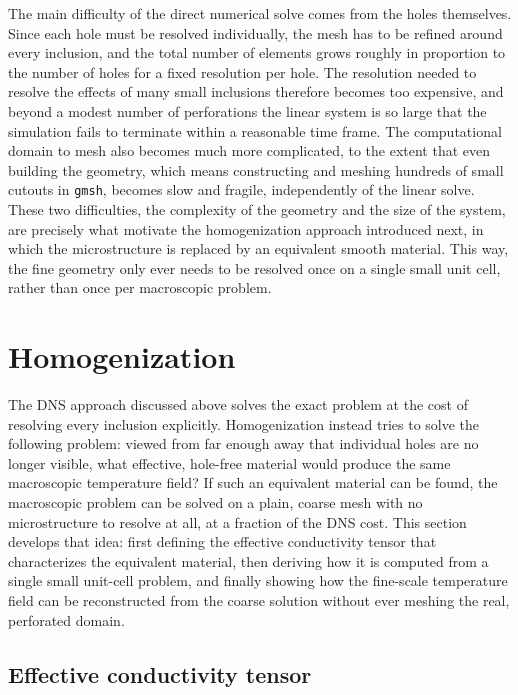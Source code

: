 \documentclass{article}
\makeatletter
\providecommand\FloatBarrier{\par\begingroup\let\@elt\relax
  \edef\@tempa{\@botlist\@deferlist\@dbldeferlist}%
  \ifx\@tempa\@empty\else\clearpage\fi\endgroup}
\makeatother
\begin{document}
The main difficulty of the direct numerical solve comes from the holes themselves.
Since each hole must be resolved individually, the mesh has to be refined around every
inclusion, and the total number of elements grows roughly in proportion to the number of
holes for a fixed resolution per hole. The resolution needed to resolve the effects of
many small inclusions therefore becomes too expensive, and beyond a modest number of
perforations the linear system is so large that the simulation fails to terminate within
a reasonable time frame. The computational domain to mesh also becomes much more
complicated, to the extent that even building the geometry, which means constructing and
meshing hundreds of small cutouts in \texttt{gmsh}, becomes slow and fragile,
independently of the linear solve. These two difficulties, the complexity of the geometry
and the size of the system, are precisely what motivate the homogenization approach
introduced next, in which the microstructure is replaced by an equivalent smooth material.
This way, the fine geometry only ever needs to be resolved once on a single small unit
cell, rather than once per macroscopic problem.

\FloatBarrier
\section{Homogenization }

The DNS approach discussed above solves the exact problem at the cost of
resolving every inclusion explicitly. Homogenization instead tries to solve the following problem: viewed
from far enough away that individual holes are no longer visible, what
effective, hole-free material would produce the same macroscopic
temperature field? If such an equivalent material can be found, the
macroscopic problem can be solved on a plain, coarse mesh with no
microstructure to resolve at all, at a fraction of the DNS cost. This section
develops that idea: first defining the effective conductivity tensor that
characterizes the equivalent material, then deriving how it is computed from
a single small unit-cell problem, and finally showing how the fine-scale
temperature field can be reconstructed from the coarse solution without ever
meshing the real, perforated domain.

\FloatBarrier
\subsection{Effective conductivity tensor }
\label{sec:effective}
\end{document}
